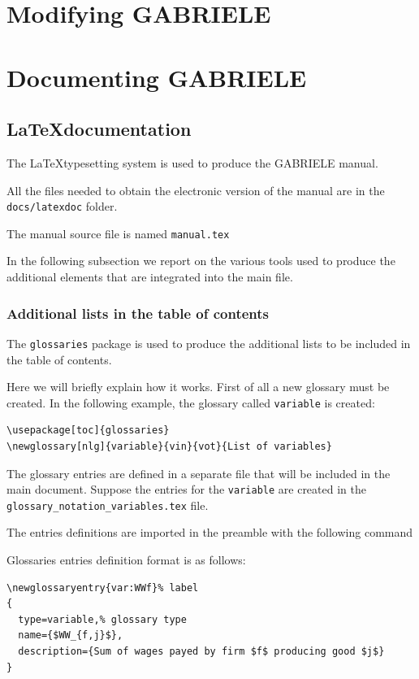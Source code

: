 \documentclass{book}
\begin{document}
\part{Modifying GABRIELE}

\part{Documenting GABRIELE}


\chapter{\LaTeX documentation}
The \LaTeX typesetting system is used to produce the GABRIELE manual.

All the files needed to obtain the electronic version of the manual are in the \verb+docs/latexdoc+ folder.

The manual source file is named \verb+manual.tex+

In the following subsection we report on the various tools used to produce the additional elements that are integrated into the main file. 

\section{Additional lists in the table of contents}
The \verb+glossaries+ package is used to produce the additional lists to be included in the table of contents.

Here we will briefly explain how it works. First of all a new glossary must be created. In the following example, the glossary called \verb+variable+ is created: 

\begin{verbatim}
\usepackage[toc]{glossaries}
\newglossary[nlg]{variable}{vin}{vot}{List of variables}
\end{verbatim}

The glossary entries are defined in a separate file that will be included in the main document. Suppose the entries for the \verb+variable+ are created in the \verb+glossary_notation_variables.tex+ file. 

The entries definitions are imported in the preamble with the following command\\
\verb++

Glossaries entries definition format is as follows:

\begin{verbatim}
\newglossaryentry{var:WWf}% label 
{ 
  type=variable,% glossary type 
  name={$WW_{f,j}$}, 
  description={Sum of wages payed by firm $f$ producing good $j$} 
}
\end{verbatim}
\end{document}
